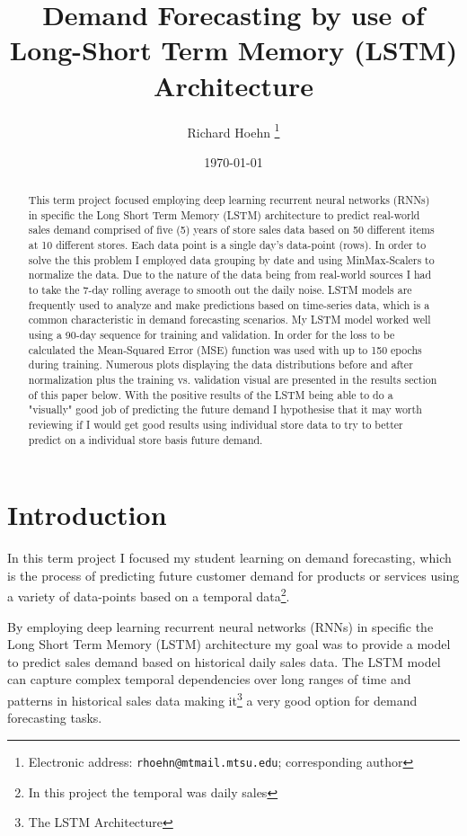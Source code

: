 \documentclass[10pt, journal, letterpaper, compsoc]{IEEEtran}
\title{Demand Forecasting by use of\\Long-Short Term Memory (LSTM) Architecture}
\author{Richard Hoehn%
	\thanks{Electronic address: \texttt{rhoehn@mtmail.mtsu.edu}; corresponding author}}
\affil{Middle Tennessee State University\\ \small CSCI 7850\\ \small Prof. Dr. Joshua L. Phillips}
\date{\vspace{1em}\today}
\begin{document}
\maketitle

\begin{abstract}
This term project focused employing deep learning recurrent neural networks (RNNs) in specific the Long Short Term Memory (LSTM) architecture to predict real-world sales demand comprised of five (5) years of store sales data based on 50 different items at 10 different stores. Each data point is a single day's data-point (rows). In order to solve the this problem I employed data grouping by date and using MinMax-Scalers to normalize the data. Due to the nature of the data being from real-world sources I had to take the 7-day rolling average to smooth out the daily noise. LSTM models are frequently used\cite{pharma-sales-forecast-lstm} to analyze and make predictions based on time-series data, which is a common characteristic in demand forecasting scenarios. My LSTM model worked well using a 90-day sequence for training and validation. In order for the loss to be calculated the Mean-Squared Error (MSE) function was used with up to 150 epochs during training. Numerous plots displaying the data distributions before and after normalization plus the training vs. validation visual are presented in the results section of this paper below. With the positive results of the LSTM being able to do a "visually" good job of predicting the future demand I hypothesise that it may worth reviewing if I would get good results using individual store data to try to better predict on a individual store basis future demand.
\end{abstract}


\section{Introduction}
In this term project I focused my student learning on demand forecasting, which is the process of predicting future customer demand for products or services using a variety of data-points based on a temporal data\footnote{In this project the temporal was daily sales}.

By employing deep learning recurrent neural networks (RNNs) in specific the Long Short Term Memory (LSTM) architecture my goal was to provide a model to predict sales demand based on historical daily sales data. The LSTM model can capture complex temporal dependencies over long ranges of time and patterns in historical sales data\cite{pharma-sales-forecast-lstm, predicting-sales-lstm, lstm-gru-performance} making it\footnote{The LSTM Architecture} a very good option for demand forecasting tasks.
\end{document}
